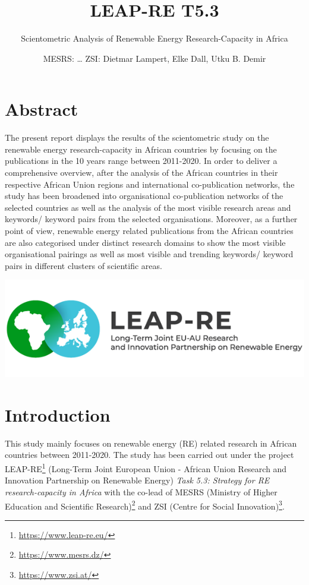\documentclass[
]{book}
\title{LEAP-RE T5.3}
\subtitle{Scientometric Analysis of Renewable Energy Research-Capacity in Africa}
\author{MESRS: \ldots{} \textbar{} ZSI: Dietmar Lampert, Elke Dall, Utku B. Demir}
\date{}
\renewcommand{\href}[2]{#2\footnote{\url{#1}}}
\begin{document}
\maketitle

{
\setcounter{tocdepth}{1}
\tableofcontents
}
\hypertarget{abstract}{%
\chapter*{Abstract}\label{abstract}}

The present report displays the results of the scientometric study on the renewable energy
research-capacity in African countries by focusing on the publications in the 10 years range between 2011-2020. In order to deliver a comprehensive overview, after the analysis of the African countries in their respective African Union regions and international co-publication networks, the study has been broadened into organisational co-publication networks of the selected countries as well as the analysis of the most visible research areas and keywords/ keyword pairs from the selected organisations. Moreover, as a further point of view, renewable energy related publications from the African countries are also categorised under distinct research domains to show the most visible organisational pairings as well as most visible and trending keywords/ keyword pairs in different clusters of scientific areas.

\includegraphics[width=1\linewidth]{../01_bookdown/leapre}

\hypertarget{intro}{%
\chapter{Introduction}\label{intro}}

This study mainly focuses on renewable energy (RE) related research in African countries between 2011-2020. The study has been carried out under the project \href{https://www.leap-re.eu/}{LEAP-RE} (Long-Term Joint European Union - African Union Research and Innovation Partnership on Renewable Energy) \emph{Task 5.3: Strategy for RE research-capacity in Africa} with the co-lead of \href{https://www.mesrs.dz/}{MESRS (Ministry of Higher Education and Scientific Research)} and \href{https://www.zsi.at/}{ZSI (Centre for Social Innovation)}.
\end{document}
